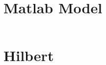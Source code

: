 \appendix

\chapter{Matlab Model}
\label{app:matlabmodel}
\inputminted[linenos, breaklines, bgcolor=lightgray, firstline=1, lastline=53]{matlab}{../Matlab/IFsine/HilbertTest.m}

\chapter{Hilbert}
\label{app:hilbert}
\inputminted[linenos, breaklines, bgcolor=lightgray]{matlab}{../Matlab/IFsine/getIF.m}